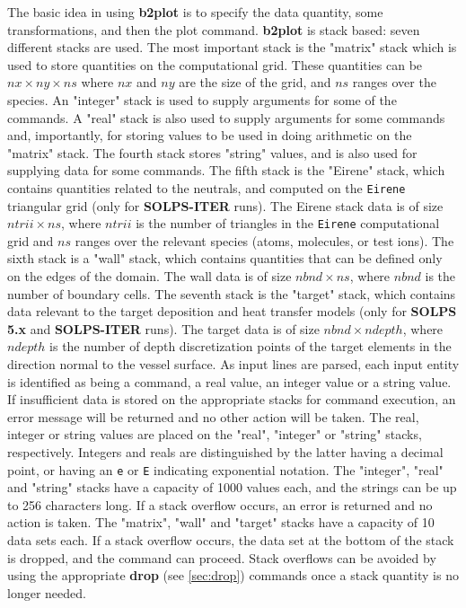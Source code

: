 \documentclass[a4paper,10pt]{report}
\newcommand\SOLPSfive{{\bf SOLPS 5.x} }
\newcommand\SOLPSITER{{\bf SOLPS-ITER} }
\newcommand{\btwoplot}{{\bf b2plot} }
\begin{document}
The basic idea in using \btwoplot is to specify the data quantity, some
transformations, and then the plot command.  \btwoplot is stack
based: seven different stacks are used.
The most important stack is
the "matrix" stack which is used to store quantities on the
computational grid.  These quantities can be $nx \times ny \times
ns$ where $nx$ and $ny$ are the size of the grid, and $ns$ ranges over
the species.  An "integer" stack is used to supply arguments for some of
the commands.  A "real" stack is also used to supply arguments for some
commands and, importantly, for storing values to be used in doing
arithmetic on the "matrix" stack.  The fourth stack stores
"string" values, and is also used for supplying data for some
commands.
The fifth stack is the "Eirene" stack, which contains quantities related
to the neutrals, and computed on the {\tt Eirene} triangular grid (only
for \SOLPSITER runs). The Eirene stack data is of size $ntrii \times ns$,
where $ntrii$ is the number of triangles in the {\tt Eirene} computational
grid and $ns$ ranges over the relevant species (atoms, molecules, or test
ions).
The sixth stack is a "wall" stack, which contains
quantities that can be defined only on the edges of the domain.
The wall data is of size $nbnd \times ns$, where $nbnd$ is the number
of boundary cells.
The seventh stack is the "target" stack, which contains data relevant
to the target deposition and heat transfer models (only for \SOLPSfive
and \SOLPSITER runs).
The target data is of size $nbnd \times ndepth$, where $ndepth$
is the number of depth discretization points of the target elements in the
direction normal to the vessel surface.
As input lines are parsed, each input entity is identified
as being a command, a real value, an integer value or a string value.
If insufficient data is stored on the appropriate stacks for
command execution, an error message will be returned and no other action will be taken.
The real, integer or string values are placed on the "real",
"integer" or "string" stacks, respectively.  Integers and reals
are distinguished by the latter having a decimal point, or having an
{\tt e} or {\tt E} indicating exponential notation.  The "integer",
"real" and "string" stacks have a capacity of 1000 values each,
and the strings can be up to 256 characters long.
If a stack overflow occurs, an error is returned and no action is taken.
The "matrix", "wall" and "target" stacks have a capacity of 10 data
sets each. If a stack overflow occurs, the data set at the bottom of the stack
is dropped, and the command can proceed. Stack overflows can be avoided by using
the appropriate {\bf drop} (see \ref{sec:drop}) commands once a stack quantity is
no longer needed.
\end{document}
